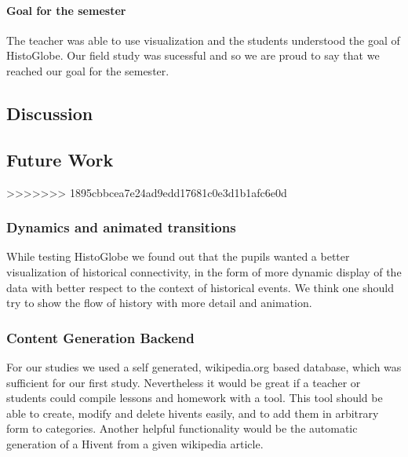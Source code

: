 \paragraph{Goal for the semester} %
The teacher was able to use visualization and the students understood the goal of HistoGlobe. Our field study was sucessful and so we are proud to say that we reached our goal for the semester.

\subsection{Discussion} %
\label{sub:discussion}


\subsection{Future Work} %
\label{sub:future_work}
>>>>>>> 1895cbbcea7e24ad9edd17681c0e3d1b1afc6e0d

\subsubsection{Dynamics and animated transitions} %
\label{sub:dynamics_and_animated_transitions}
While testing HistoGlobe we found out that the pupils wanted a better visualization of historical connectivity, in the form of  more dynamic display of the data with better respect to the context of historical events. We think one should try to show the flow of history with more detail and animation.



\subsubsection{Content Generation Backend} %
\label{sub:content_generation_backend}

For our studies we used a self generated, wikipedia.org based database, which was sufficient for our first study. Nevertheless it would be great if a teacher or students could compile lessons and homework with a tool. This tool should be able to create, modify and delete hivents easily, and to add them in arbitrary form to categories.
Another helpful functionality would be the automatic generation of a Hivent from a given wikipedia article.


